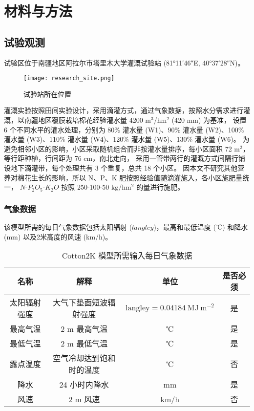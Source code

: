 \chapter{材料与方法}

\section{试验观测}
试验区位于南疆地区阿拉尔市塔里木大学灌溉试验站 (\ang{81;11;46}E, \ang{40;37;28}N)。
\begin{figure}
    \centering
    \texttt{[image: research\_site.png]}
    \caption{试验站所在位置}
\end{figure}
灌溉实验按照田间实验设计，采用滴灌方式，通过气象数据，按照水分需求进行灌溉，以南疆地区覆膜栽培棉花经验灌水量 4200 m$^3$/hm$^2$ (420 mm) 为基准，%
设置 6 个不同水平的灌水处理，分别为 80\% 灌水量 (W1)、90\% 灌水量 (W2)、100\% 灌水量 (W3)、110\% 灌水量 (W4)、120\% 灌水量 (W5)、130\% 灌水量 (W6)。
为避免相邻小区的影响，小区采取随机组合而非按灌水量排序，每小区面积 72 m$^2$，等行距种植，行间距为 76 cm，南北走向，%
采用一管带两行的灌溉方式间隔行铺设地下滴灌带，每个处理共有 3 个重复，总共 18 个小区。
因本文不研究其他营养对棉花生长的影响，所以 N、P、K 肥按照经验值随滴灌施入，各小区施肥量统一，%
$N$-$P_2O_5$-$K_2O$ 按照 250-100-50 $\mathrm{kg/hm^2}$ 的量进行施肥。

\subsection{气象数据}

该模型所需的每日气象数据包括太阳辐射 ($langley$)，最高和最低温度 (℃) 和降水 (mm) 以及2米高度的风速 (km/h)。

\begin{table}
    \caption{Cotton2K 模型所需输入每日气象数据}\label{tab:meteorology}
    \small
    \centering
    \begin{tabular}{cccc}
        \toprule
        名称         & 解释                     & 单位                                              & 是否必须 \\
        \midrule
        太阳辐射强度 & 大气下垫面短波辐射强度   & $\mathrm{langley} = 0.04184\ \mathrm{MJ\ m^{-2}}$ & 是       \\
        最高气温     & 2 m 最高气温             & ℃                                                 & 是       \\
        最低气温     & 2 m 最低气温             & ℃                                                 & 是       \\
        露点温度     & 空气冷却达到饱和时的温度 & ℃                                                 & 否       \\
        降水         & 24 小时内降水            & mm                                                & 是       \\
        风速         & 2 m 风速                 & km/h                                              & 否       \\
        \bottomrule
    \end{tabular}
\end{table}

